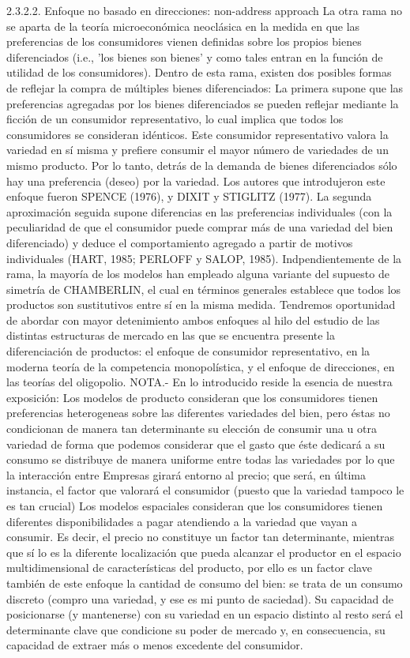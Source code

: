\documentclass[10pt,a4paper]{article}
\begin{document}
2.3.2.2. Enfoque no basado en direcciones: non-address approach
La otra rama no se aparta de la teoría microeconómica neoclásica en la medida en que las preferencias de los consumidores vienen definidas sobre los propios bienes diferenciados (i.e., 'los bienes son bienes' y como tales entran en la función de utilidad de los consumidores). Dentro de esta rama, existen dos posibles formas de reflejar la compra de múltiples bienes diferenciados: 
	La primera supone que las preferencias agregadas por los bienes diferenciados se pueden reflejar mediante la ficción de un consumidor representativo, lo cual implica que todos los consumidores se consideran idénticos.  Este consumidor representativo valora la variedad en sí misma y prefiere consumir el mayor número de variedades de un mismo producto. Por lo tanto, detrás de la demanda de bienes diferenciados sólo hay una preferencia (deseo) por la variedad.  Los autores que introdujeron este enfoque fueron SPENCE (1976), y DIXIT y STIGLITZ (1977). 
	La segunda aproximación seguida supone diferencias en las preferencias individuales (con la peculiaridad de que el consumidor puede comprar más de una variedad del bien diferenciado) y deduce el comportamiento agregado a partir de motivos individuales (HART, 1985; PERLOFF y SALOP, 1985).  
Indpendientemente de la rama, la mayoría de los modelos han empleado alguna variante del supuesto de simetría de CHAMBERLIN, el cual en términos generales establece que todos los productos son sustitutivos entre sí en la misma medida. 
Tendremos oportunidad de abordar con mayor detenimiento ambos enfoques al hilo del estudio de las distintas estructuras de mercado en las que se encuentra presente la diferenciación de productos: el enfoque de consumidor representativo, en la moderna teoría de la competencia monopolística, y el enfoque de direcciones, en las teorías del oligopolio. 
NOTA.- En lo introducido reside la esencia de nuestra exposición:
	Los modelos de producto consideran que los consumidores tienen preferencias heterogeneas sobre las diferentes variedades del bien, pero éstas no condicionan de manera tan determinante su elección de consumir una u otra variedad de forma que podemos considerar que el gasto que éste dedicará a su consumo se distribuye de manera uniforme entre todas las variedades por lo que la interacción entre Empresas girará entorno al precio; que será, en última instancia, el factor que valorará el consumidor (puesto que la variedad tampoco le es tan crucial)  
	Los modelos espaciales consideran que los consumidores tienen diferentes disponibilidades a pagar atendiendo a la variedad que vayan a consumir. Es decir, el precio no constituye un factor tan determinante, mientras que sí lo es la diferente localización que pueda alcanzar el productor en el espacio multidimensional de características del producto, por ello es un factor clave también de este enfoque la cantidad de consumo del bien: se trata de un consumo discreto (compro una variedad, y ese es mi punto de saciedad). Su capacidad de posicionarse (y mantenerse) con su variedad en un espacio distinto al resto será el determinante clave que condicione su poder de mercado y, en consecuencia, su capacidad de extraer más o menos excedente del consumidor. 
\end{document}
